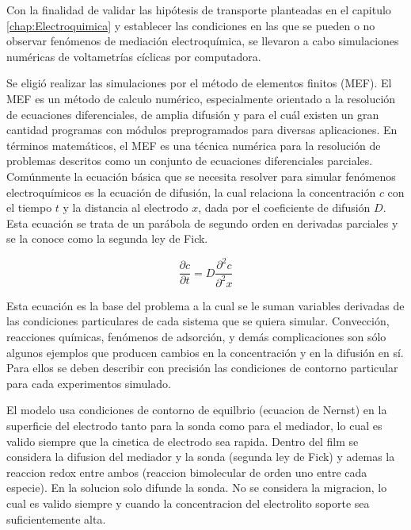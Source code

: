 	 	 Con la finalidad de validar las hipótesis de transporte planteadas en el capitulo \ref{chap:Electroquimica} y establecer las condiciones en las que se pueden o no observar fenómenos de mediación electroquímica, se llevaron a cabo simulaciones numéricas de voltametrías cíclicas por computadora.

	 	 Se eligió realizar las simulaciones por el método de elementos finitos (MEF). El MEF es un método de calculo numérico, especialmente orientado a la resolución de ecuaciones diferenciales, de amplia difusión y para el cuál existen un gran cantidad programas con módulos preprogramados para diversas aplicaciones. En términos matemáticos, el MEF es una técnica numérica para la resolución de problemas descritos como un conjunto de ecuaciones diferenciales parciales. Comúnmente la ecuación básica que se necesita resolver para simular fenómenos electroquímicos es la ecuación de difusión, la cual relaciona la concentración $c$ con el tiempo $t$ y la distancia al electrodo $x$, dada por el coeficiente de difusión $D$.\cite{Britz2005,Nann2003} Esta ecuación se trata de un parábola de segundo orden en derivadas parciales y se la conoce como la segunda ley de Fick.\cite{fick1855}

	 	 \begin{equation}
	 	 	\frac{\partial c}{\partial t}=D\frac{\partial^2 c}{\partial^2 x}
	 	 \end{equation}

	 	 Esta ecuación es la base del problema a la cual se le suman variables derivadas de las condiciones particulares de cada sistema que se quiera simular. Convección, reacciones químicas, fenómenos de adsorción, y demás complicaciones son sólo algunos ejemplos que producen cambios en la concentración y en la difusión en sí. Para ellos se deben describir con precisión las condiciones de contorno particular para cada experimentos simulado.

	 	 El modelo usa condiciones de contorno de equilbrio (ecuacion de Nernst) en la superficie del electrodo tanto para la sonda como para el mediador, lo cual es valido siempre que la cinetica de electrodo sea rapida. Dentro del film se considera la difusion del mediador y la sonda (segunda ley de Fick) y ademas la reaccion redox entre ambos (reaccion bimolecular de orden uno entre cada especie). En la solucion solo difunde la sonda. No se considera la migracion, lo cual es valido siempre y cuando la concentracion del electrolito soporte sea suficientemente alta. 

